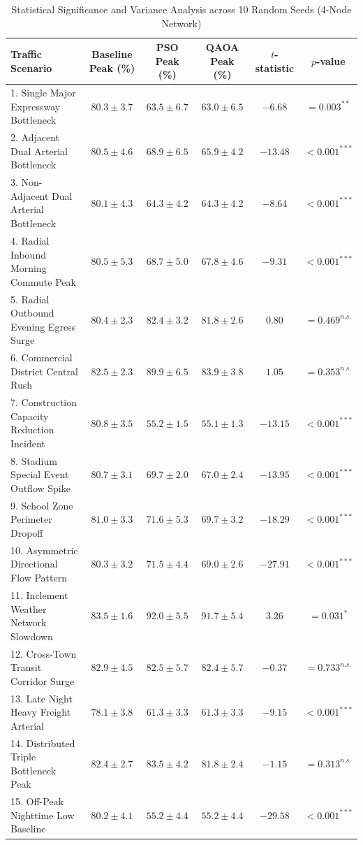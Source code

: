 \begin{table}[h!]
\centering
\caption{Statistical Significance and Variance Analysis across 10 Random Seeds (4-Node Network)}
\label{tab:statistical_variance}
\begin{tabular}{l c c c c c}
\hline\hline
Traffic Scenario & Baseline Peak (\%) & PSO Peak (\%) & QAOA Peak (\%) & $t$-statistic & $p$-value \\
\hline
1. Single Major Expressway Bottleneck  & $80.3 ± 3.7$ & $63.5 ± 6.7$ & $63.0 ± 6.5$ & $-6.68$ & $= 0.003^{**}$ \\
2. Adjacent Dual Arterial Bottleneck   & $80.5 ± 4.6$ & $68.9 ± 6.5$ & $65.9 ± 4.2$ & $-13.48$ & $< 0.001^{***}$ \\
3. Non-Adjacent Dual Arterial Bottleneck & $80.1 ± 4.3$ & $64.3 ± 4.2$ & $64.3 ± 4.2$ & $-8.64$ & $< 0.001^{***}$ \\
4. Radial Inbound Morning Commute Peak & $80.5 ± 5.3$ & $68.7 ± 5.0$ & $67.8 ± 4.6$ & $-9.31$ & $< 0.001^{***}$ \\
5. Radial Outbound Evening Egress Surge & $80.4 ± 2.3$ & $82.4 ± 3.2$ & $81.8 ± 2.6$ & $0.80$ & $= 0.469^{n.s.}$ \\
6. Commercial District Central Rush    & $82.5 ± 2.3$ & $89.9 ± 6.5$ & $83.9 ± 3.8$ & $1.05$ & $= 0.353^{n.s.}$ \\
7. Construction Capacity Reduction Incident & $80.8 ± 3.5$ & $55.2 ± 1.5$ & $55.1 ± 1.3$ & $-13.15$ & $< 0.001^{***}$ \\
8. Stadium Special Event Outflow Spike & $80.7 ± 3.1$ & $69.7 ± 2.0$ & $67.0 ± 2.4$ & $-13.95$ & $< 0.001^{***}$ \\
9. School Zone Perimeter Dropoff       & $81.0 ± 3.3$ & $71.6 ± 5.3$ & $69.7 ± 3.2$ & $-18.29$ & $< 0.001^{***}$ \\
10. Asymmetric Directional Flow Pattern & $80.3 ± 3.2$ & $71.5 ± 4.4$ & $69.0 ± 2.6$ & $-27.91$ & $< 0.001^{***}$ \\
11. Inclement Weather Network Slowdown & $83.5 ± 1.6$ & $92.0 ± 5.5$ & $91.7 ± 5.4$ & $3.26$ & $= 0.031^{*}$ \\
12. Cross-Town Transit Corridor Surge  & $82.9 ± 4.5$ & $82.5 ± 5.7$ & $82.4 ± 5.7$ & $-0.37$ & $= 0.733^{n.s.}$ \\
13. Late Night Heavy Freight Arterial  & $78.1 ± 3.8$ & $61.3 ± 3.3$ & $61.3 ± 3.3$ & $-9.15$ & $< 0.001^{***}$ \\
14. Distributed Triple Bottleneck Peak & $82.4 ± 2.7$ & $83.5 ± 4.2$ & $81.8 ± 2.4$ & $-1.15$ & $= 0.313^{n.s.}$ \\
15. Off-Peak Nighttime Low Baseline    & $80.2 ± 4.1$ & $55.2 ± 4.4$ & $55.2 ± 4.4$ & $-29.58$ & $< 0.001^{***}$ \\
\hline\hline
\end{tabular}
\end{table}
